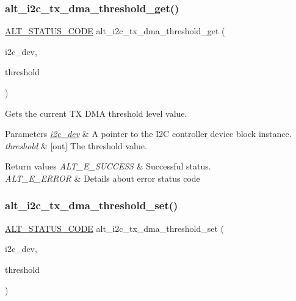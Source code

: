 \subsubsection{\texorpdfstring{alt\_i2c\_tx\_dma\_threshold\_get()}{alt\_i2c\_tx\_dma\_threshold\_get()}}
{\footnotesize\ttfamily \mbox{\hyperlink{hwlib_8h_abdb0d369f069723ca55d6c94bcaaaa12}{A\+L\+T\+\_\+\+S\+T\+A\+T\+U\+S\+\_\+\+C\+O\+DE}} alt\+\_\+i2c\+\_\+tx\+\_\+dma\+\_\+threshold\+\_\+get (\begin{DoxyParamCaption}\item[{\mbox{\hyperlink{structALT__I2C__DEV__s}{A\+L\+T\+\_\+\+I2\+C\+\_\+\+D\+E\+V\+\_\+t}} $\ast$}]{i2c\+\_\+dev,  }\item[{uint8\+\_\+t $\ast$}]{threshold }\end{DoxyParamCaption})}

Gets the current TX D\+MA threshold level value.


\begin{DoxyParams}{Parameters}
{\em \mbox{\hyperlink{structi2c__dev}{i2c\+\_\+dev}}} & A pointer to the I2C controller device block instance.\\
\hline
{\em threshold} & \mbox{[}out\mbox{]} The threshold value.\\
\hline
\end{DoxyParams}

\begin{DoxyRetVals}{Return values}
{\em A\+L\+T\+\_\+\+E\+\_\+\+S\+U\+C\+C\+E\+SS} & Successful status. \\
\hline
{\em A\+L\+T\+\_\+\+E\+\_\+\+E\+R\+R\+OR} & Details about error status code \\
\hline
\end{DoxyRetVals}
\mbox{\label{group__ALT__I2C__DMA_ga3aaf92e0837ceb1c37af47b603985c5c}} 
\subsubsection{\texorpdfstring{alt\_i2c\_tx\_dma\_threshold\_set()}{alt\_i2c\_tx\_dma\_threshold\_set()}}
{\footnotesize\ttfamily \mbox{\hyperlink{hwlib_8h_abdb0d369f069723ca55d6c94bcaaaa12}{A\+L\+T\+\_\+\+S\+T\+A\+T\+U\+S\+\_\+\+C\+O\+DE}} alt\+\_\+i2c\+\_\+tx\+\_\+dma\+\_\+threshold\+\_\+set (\begin{DoxyParamCaption}\item[{\mbox{\hyperlink{structALT__I2C__DEV__s}{A\+L\+T\+\_\+\+I2\+C\+\_\+\+D\+E\+V\+\_\+t}} $\ast$}]{i2c\+\_\+dev,  }\item[{uint8\+\_\+t}]{threshold }\end{DoxyParamCaption})}

